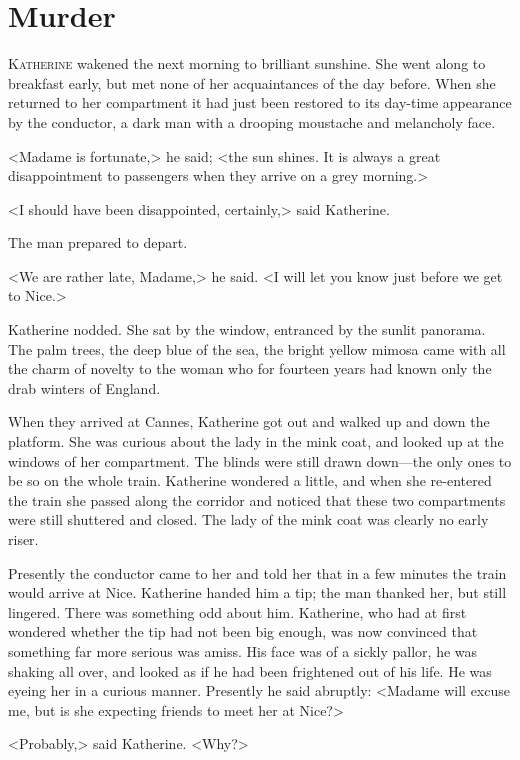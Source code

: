 \chapter{Murder}



\lettrine{K}{atherine} wakened the next morning to brilliant sunshine. She went along to breakfast early, but met none of her acquaintances of the day before. When she returned to her compartment it had just been restored to its day-time appearance by the conductor, a dark man with a drooping moustache and melancholy face.

<Madame is fortunate,> he said; <the sun shines. It is always a great disappointment to passengers when they arrive on a grey morning.>

<I should have been disappointed, certainly,> said Katherine.

The man prepared to depart.

<We are rather late, Madame,> he said. <I will let you know just before we get to Nice.>

Katherine nodded. She sat by the window, entranced by the sunlit panorama. The palm trees, the deep blue of the sea, the bright yellow mimosa came with all the charm of novelty to the woman who for fourteen years had known only the drab winters of England.

When they arrived at Cannes, Katherine got out and walked up and down the platform. She was curious about the lady in the mink coat, and looked up at the windows of her compartment. The blinds were still drawn down—the only ones to be so on the whole train. Katherine wondered a little, and when she re-entered the train she passed along the corridor and noticed that these two compartments were still shuttered and closed. The lady of the mink coat was clearly no early riser.

Presently the conductor came to her and told her that in a few minutes the train would arrive at Nice. Katherine handed him a tip; the man thanked her, but still lingered. There was something odd about him. Katherine, who had at first wondered whether the tip had not been big enough, was now convinced that something far more serious was amiss. His face was of a sickly pallor, he was shaking all over, and looked as if he had been frightened out of his life. He was eyeing her in a curious manner. Presently he said abruptly: <Madame will excuse me, but is she expecting friends to meet her at Nice?>

<Probably,> said Katherine. <Why?>

